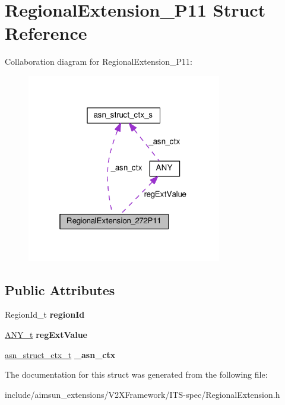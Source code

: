 \hypertarget{structRegionalExtension__272P11}{}\section{Regional\+Extension\+\_\+P11 Struct Reference}
\label{structRegionalExtension__272P11}


Collaboration diagram for Regional\+Extension\+\_\+P11\+:\nopagebreak
\begin{figure}[H]
\begin{center}
\leavevmode
\includegraphics[width=241pt]{structRegionalExtension__272P11__coll__graph}
\end{center}
\end{figure}
\subsection*{Public Attributes}
\begin{DoxyCompactItemize}
\item 
Region\+Id\+\_\+t {\bfseries region\+Id}\hypertarget{structRegionalExtension__272P11_a57d16ad7754d8e072462f47cf57dddd9}{}\label{structRegionalExtension__272P11_a57d16ad7754d8e072462f47cf57dddd9}

\item 
\hyperlink{structANY}{A\+N\+Y\+\_\+t} {\bfseries reg\+Ext\+Value}\hypertarget{structRegionalExtension__272P11_a9fedcf9cac5a4019cf1416cbc5d3ab7c}{}\label{structRegionalExtension__272P11_a9fedcf9cac5a4019cf1416cbc5d3ab7c}

\item 
\hyperlink{structasn__struct__ctx__s}{asn\+\_\+struct\+\_\+ctx\+\_\+t} {\bfseries \+\_\+asn\+\_\+ctx}\hypertarget{structRegionalExtension__272P11_a84a544ec0b81c9d7512b748bcb43971a}{}\label{structRegionalExtension__272P11_a84a544ec0b81c9d7512b748bcb43971a}

\end{DoxyCompactItemize}


The documentation for this struct was generated from the following file\+:\begin{DoxyCompactItemize}
\item 
include/aimsun\+\_\+extensions/\+V2\+X\+Framework/\+I\+T\+S-\/spec/Regional\+Extension.\+h\end{DoxyCompactItemize}
